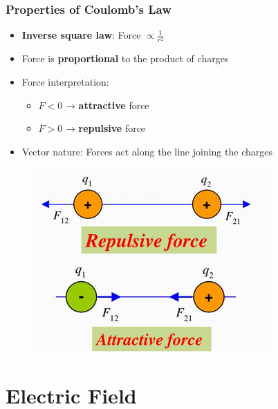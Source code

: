 \documentclass{beamer}
\begin{document}
\begin{frame}
    \frametitle{Properties of Coulomb's Law}
    \begin{itemize}
        \item \textbf{Inverse square law}: Force $\propto \frac{1}{r^2}$
        \item Force is \textbf{proportional} to the product of charges
        \item Force interpretation:
            \begin{itemize}
                \item $F < 0$ → \textbf{attractive} force
                \item $F > 0$ → \textbf{repulsive} force
            \end{itemize}
        \item Vector nature: Forces act along the line joining the charges
    \end{itemize}
    
    
       \begin{figure}
           \centering
           \includegraphics[width=1\linewidth]{phys11-electrostatics-coulomb-force-types.png}
       \end{figure}
    
\end{frame}

\section{Electric Field}
\end{document}
